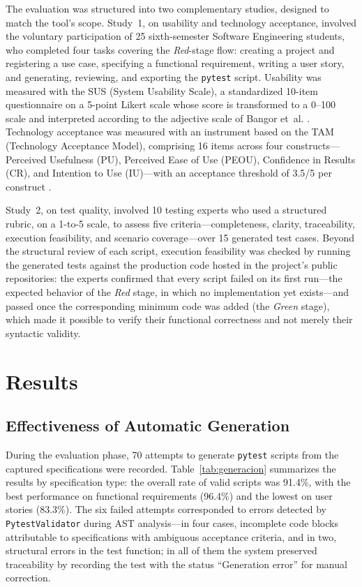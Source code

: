 \documentclass[10pt,journal,twoside,letterpaper]{IEEEtran}
\begin{document}
    The evaluation was structured into two complementary studies, designed to match the tool's scope. Study~1, on usability and technology acceptance, involved the voluntary participation of 25 sixth-semester Software Engineering students, who completed four tasks covering the \emph{Red}-stage flow: creating a project and registering a use case, specifying a functional requirement, writing a user story, and generating, reviewing, and exporting the \texttt{pytest} script. Usability was measured with the SUS (System Usability Scale), a standardized 10-item questionnaire on a 5-point Likert scale whose score is transformed to a 0--100 scale and interpreted according to the adjective scale of Bangor et~al. \cite{brooke1996sus,bangor2009sus}. Technology acceptance was measured with an instrument based on the TAM (Technology Acceptance Model), comprising 16 items across four constructs---Perceived Usefulness (PU), Perceived Ease of Use (PEOU), Confidence in Results (CR), and Intention to Use (IU)---with an acceptance threshold of 3.5/5 per construct \cite{davis1989tam}.
    
    Study~2, on test quality, involved 10 testing experts who used a structured rubric, on a 1-to-5 scale, to assess five criteria---completeness, clarity, traceability, execution feasibility, and scenario coverage---over 15 generated test cases. Beyond the structural review of each script, execution feasibility was checked by running the generated tests against the production code hosted in the project's public repositories: the experts confirmed that every script failed on its first run---the expected behavior of the \emph{Red} stage, in which no implementation yet exists---and passed once the corresponding minimum code was added (the \emph{Green} stage), which made it possible to verify their functional correctness and not merely their syntactic validity.
    
    \section{Results}
    \label{sec:resultados}
    
    \subsection{Effectiveness of Automatic Generation}
    \label{subsec:generacion}
    
    During the evaluation phase, 70 attempts to generate \texttt{pytest} scripts from the captured specifications were recorded. Table~\ref{tab:generacion} summarizes the results by specification type: the overall rate of valid scripts was 91.4\%, with the best performance on functional requirements (96.4\%) and the lowest on user stories (83.3\%). The six failed attempts corresponded to errors detected by \texttt{PytestValidator} during AST analysis---in four cases, incomplete code blocks attributable to specifications with ambiguous acceptance criteria, and in two, structural errors in the test function; in all of them the system preserved traceability by recording the test with the status ``Generation error'' for manual correction.
    
\end{document}
